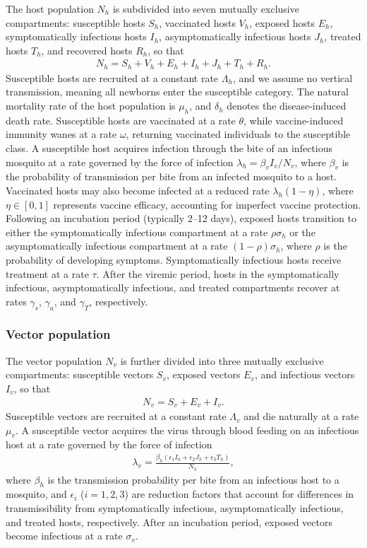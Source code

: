 \documentclass[9pt]{article}
\numberwithin{equation}{section}
\begin{document}
The host population $N_h$ is subdivided into seven mutually exclusive compartments: susceptible hosts $S_h$, vaccinated hosts $V_h$, exposed hosts $E_h$, symptomatically infectious hosts $I_h$, asymptomatically infectious hosts $J_h$, treated hosts $T_h$, and recovered hosts $R_h$, so that
\begin{align}
N_h = S_h + V_h + E_h + I_h + J_h + T_h + R_h.    
\end{align}
Susceptible hosts are recruited at a constant rate $\Lambda_h$, and we assume no vertical transmission, meaning all newborns enter the susceptible category. The natural mortality rate of the host population is $\mu_h$, and $\delta_h$ denotes the disease-induced death rate. Susceptible hosts are vaccinated at a rate $\theta$, while vaccine-induced immunity wanes at a rate $\omega$, returning vaccinated individuals to the susceptible class. A susceptible host acquires infection through the bite of an infectious mosquito at a rate governed by the force of infection $\lambda_h = \beta_v I_v / N_v$, where $\beta_v$ is the probability of transmission per bite from an infected mosquito to a host. Vaccinated hosts may also become infected at a reduced rate $\lambda_h(1-\eta)$, where $\eta \in [0,1]$ represents vaccine efficacy, accounting for imperfect vaccine protection. Following an incubation period (typically 2--12 days), exposed hosts transition to either the symptomatically infectious compartment at a rate $\rho\sigma_h$ or the asymptomatically infectious compartment at a rate $(1-\rho)\sigma_h$, where $\rho$ is the probability of developing symptoms. Symptomatically infectious hosts receive treatment at a rate $\tau$. After the viremic period, hosts in the symptomatically infectious, asymptomatically infectious, and treated compartments recover at rates $\gamma_s$, $\gamma_a$, and $\gamma_T$, respectively.
\subsubsection{Vector population}
The vector population $N_v$ is further divided into three mutually exclusive compartments: susceptible vectors $S_v$, exposed vectors $E_v$, and infectious vectors $I_v$, so that
\begin{align}
N_v = S_v + E_v + I_v.
\end{align} 
Susceptible vectors are recruited at a constant rate $\Lambda_v$ and die naturally at a rate $\mu_v$. A susceptible vector acquires the virus through blood feeding on an infectious host at a rate governed by the force of infection
\begin{align}
\lambda_v = \frac{\beta_h(\epsilon_1 I_h + \epsilon_2 J_h + \epsilon_3 T_h)}{N_h},
 \end{align}
where $\beta_h$ is the transmission probability per bite from an infectious host to a mosquito, and $\epsilon_i$ ($i=1,2,3$) are reduction factors that account for differences in transmissibility from symptomatically infectious, asymptomatically infectious, and treated hosts, respectively. After an incubation period, exposed vectors become infectious at a rate $\sigma_v$.
\end{document}
